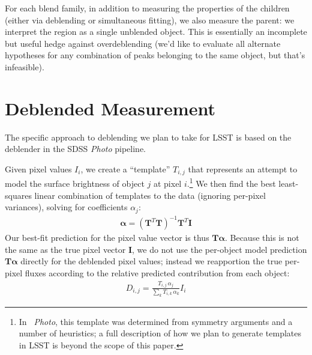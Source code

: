 \documentclass[10pt]{article}
\begin{document}
For each blend family, in addition to measuring the properties of the children
(either via deblending or simultaneous fitting), we also measure the parent:
we interpret the region as a single unblended object. This is essentially
an incomplete but useful hedge against overdeblending (we'd like to evaluate
all alternate hypotheses for any combination of peaks belonging to the same
object, but that's infeasible).

\section{Deblended Measurement}

\label{sec:deblender}

The specific approach to deblending we plan to take for LSST is based on
the deblender in the SDSS {\em Photo} pipeline.

Given pixel values $I_{i}$, we create a ``template'' $T_{i,j}$ that represents
an attempt to model the surface brightness of object $j$ at pixel
$i$.\footnote {
    In {\em~Photo}, this template was determined from symmetry arguments and a
    number of heuristics; a full description of how we plan to generate
    templates in LSST is beyond the scope of this paper.
}  We then find the best least-squares linear combination of templates to the
data (ignoring per-pixel variances), solving for coefficients $\alpha_{j}$:
\begin{align}
\bm{\alpha} = \left(\bm{T}^T\bm{T}\right)^{-1}\!\bm{T}^T\bm{I}
\end{align}
Our best-fit prediction for the pixel value vector is thus
$\bm{T}\bm{\alpha}$.
Because this is not the same as the true pixel vector $\bm{I}$, we do not use
the per-object model prediction $\bm{T}\bm{\alpha}$ directly for the deblended
pixel values; instead we reapportion the true per-pixel fluxes according to
the relative predicted contribution from each object:
\begin{align}
D_{i,j} = \frac{
    T_{i,j} \, \alpha_j
}{
    \sum\limits_k T_{i,k} \, \alpha_k
}
I_i
\end{align}
\end{document}

